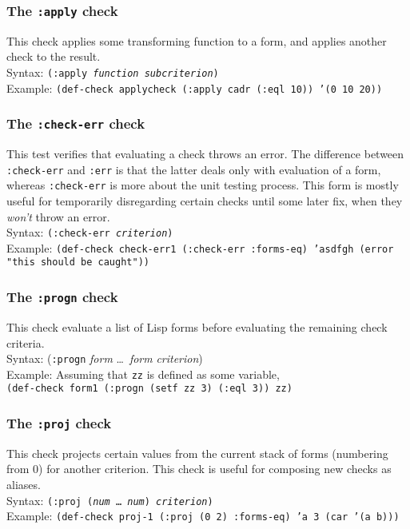\subsubsection{The \texttt{:apply} check}
This check applies some transforming function to a form, and applies
another check to the result.
\\ Syntax: \texttt{(:apply \textit{function} \textit{subcriterion})}
\\ Example: \texttt{(def-check applycheck (:apply cadr (:eql 10)) '(0 10 20))}

\subsubsection{The \texttt{:check-err} check}
This test verifies that evaluating a check throws an
error. The difference between
\texttt{:check-err} and \texttt{:err} is that the latter deals only
with evaluation of a form, whereas \texttt{:check-err} is more about
the unit testing process.  This form is mostly useful for temporarily
disregarding certain checks until some later fix, when they
\emph{won't} throw an error.
%
\\ Syntax: \texttt{(:check-err \textit{criterion})}
\\ Example: \texttt{(def-check check-err1 (:check-err :forms-eq) 'asdfgh (error "this should be caught"))}

\subsubsection{The \texttt{:progn} check}
This check evaluate a list of Lisp forms before evaluating the
remaining check criteria.
\\ Syntax: (\texttt{:progn} \textit{form} \ldots\ \textit{form} \textit{criterion})
\\ Example: Assuming that \texttt{zz} is defined as some variable,
\\ \hspace*{2em}\texttt{(def-check form1 (:progn (setf zz 3) (:eql 3)) zz)}

\subsubsection{The \texttt{:proj} check}
This check projects certain values from the current stack of forms
(numbering from 0) for another criterion.  This check is useful for
composing new checks as aliases.
\\ Syntax: \texttt{(:proj (\textit{num} \ldots\  \textit{num}) \textit{criterion})}
\\ Example: \texttt{(def-check proj-1 (:proj (0 2) :forms-eq) 'a 3 (car '(a b)))}

